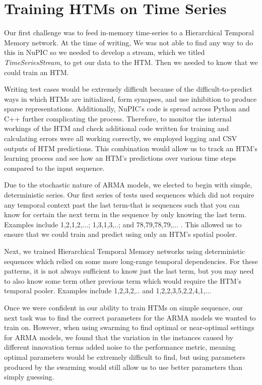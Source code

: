 \documentclass[oneside,12pt,openany]{book}
\begin{document}
    

\FloatBarrier
    
    \section{Training HTMs on Time Series}
    
    Our first challenge was to feed in-memory time-series to a Hierarchical Temporal Memory network. At the time of writing, We was not able to find any way to do this in NuPIC so we needed to develop a stream, which we titled \textit{TimeSeriesStream}, to get our data to the HTM. Then we needed to know that we could train an HTM. 
    
    Writing test cases would be extremely difficult because of the difficult-to-predict ways in which HTMs are initialized, form synapses, and use inhibition to produce sparse representations. Additionally, NuPIC's code is spread across Python and C++ further complicating the process. Therefore, to monitor the internal workings of the HTM and check additional code written for training and calculating errors were all working correctly, we employed logging and CSV outputs of HTM predictions. This combination would allow us to track an HTM's learning process and see how an HTM's predictions over various time steps compared to the input sequence.
    
    Due to the stochastic nature of ARMA models, we elected to begin with simple, deterministic series. Our first series of tests used sequences which did not require any temporal context past the last term-that is sequences such that you can know for certain the next term in the sequence by only knowing the last term. Examples include 1,2,1,2,...; 1,3,1,3,..; and 78,79,78,79,... . This allowed us to ensure that we could train and predict using only an HTM's spatial pooler.
    
    Next, we trained Hierarchical Temporal Memory networks using deterministic sequences which relied on some more long-range temporal dependencies. For these patterns, it is not always sufficient to know just the last term, but you may need to also know some term other previous term which would require the HTM's temporal pooler. Examples include 1,2,3,2,.. and 1,2,2,3,5,2,2,4,1,... 
    
    Once we were confident in our ability to train HTMs on simple sequence, our next task was to find the correct parameters for the ARMA models we wanted to train on. However, when using swarming to find optimal or near-optimal settings for ARMA models, we found that the variation in the instances caused by different innovation terms added noise to the performance metric, meaning optimal parameters would be extremely difficult to find, but using parameters produced by the swarming would still allow us to use better parameters than simply guessing.
    
\end{document}
